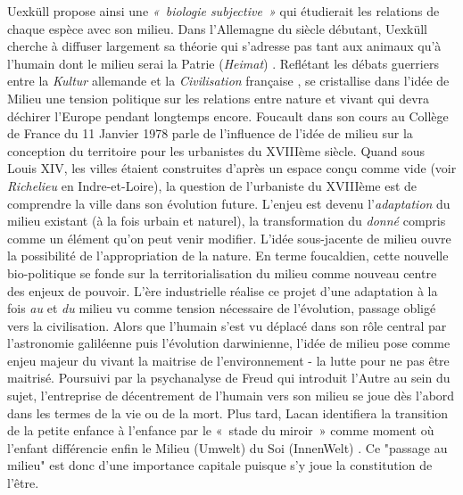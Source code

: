 Uexküll propose ainsi une \textit{« biologie subjective »} qui étudierait les relations de chaque espèce avec son milieu. Dans l’Allemagne du siècle débutant, Uexküll cherche à diffuser largement sa théorie qui s’adresse pas tant aux animaux qu’à l’humain dont le milieu serai la Patrie (\textit{Heimat}) \citep{Feuerhahn2009}. Reflétant les débats guerriers entre la \textit{Kultur} allemande et la \textit{Civilisation} française \citep{Elias1975}, se cristallise dans l’idée de Milieu une tension politique sur les relations entre nature et vivant qui devra déchirer l’Europe pendant longtemps encore. Foucault dans son cours au Collège de France du 11 Janvier 1978 parle de l’influence de l’idée de milieu sur la conception du territoire pour les urbanistes du XVIIIème siècle. Quand sous Louis XIV, les villes étaient construites d’après un espace conçu comme vide (voir \textit{Richelieu} en Indre-et-Loire), la question de l’urbaniste du XVIIIème est de comprendre la ville dans son évolution future. L’enjeu est devenu l’\textit{adaptation} du milieu existant (à la fois urbain et naturel), la transformation du \textit{donné} compris comme un élément qu’on peut venir modifier. L’idée sous-jacente de milieu ouvre la possibilité de l’appropriation de la nature. En terme foucaldien, cette nouvelle bio-politique se fonde sur la territorialisation du milieu comme nouveau centre des enjeux de pouvoir. L’ère industrielle réalise ce projet d’une adaptation à la fois \textit{au} et \textit{du} milieu vu comme tension nécessaire de l’évolution, passage obligé vers la civilisation. Alors que l’humain s’est vu déplacé dans son rôle central par l’astronomie galiléenne puis l’évolution darwinienne, l’idée de milieu pose comme enjeu majeur du vivant la maitrise de l’environnement - la lutte pour ne pas être maitrisé. Poursuivi par la psychanalyse de Freud qui introduit l’Autre au sein du sujet, l’entreprise de décentrement de l’humain vers son milieu se joue dès l’abord dans les termes de la vie ou de la mort. Plus tard, Lacan identifiera la transition de la petite enfance à l’enfance par le « stade du miroir » comme moment où l’enfant différencie enfin le Milieu (Umwelt) du Soi (InnenWelt) \citep{Lacan2001}. Ce "passage au milieu" est donc d’une importance capitale puisque s’y joue la constitution de l’être.

